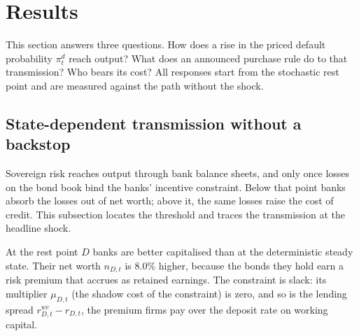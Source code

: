 \section{Results}
\label{sec:results}

This section answers three questions. How does a rise in the priced default probability
$\pi^d_t$ reach output? What does an announced purchase rule do to that transmission? Who bears
its cost? All responses start from the stochastic rest point and are measured against the path
without the shock.

\subsection{State-dependent transmission without a backstop}
\label{sec:res-rest}

Sovereign risk reaches output through bank balance sheets, and only once losses on the bond book
bind the banks' incentive constraint. Below that point banks absorb the losses out of net worth;
above it, the same losses raise the cost of credit. This subsection locates the threshold and
traces the transmission at the headline shock.

At the rest point $D$ banks are better capitalised than at the deterministic steady state. Their
net worth $n_{D,t}$ is 8.0\% higher, because the bonds they hold earn a risk premium that accrues
as retained earnings. The constraint is slack: its multiplier $\mu_{D,t}$ (the shadow cost of the
constraint) is zero, and so is the lending spread $r^{wc}_{D,t}-r_{D,t}$, the premium firms pay
over the deposit rate on working capital.


